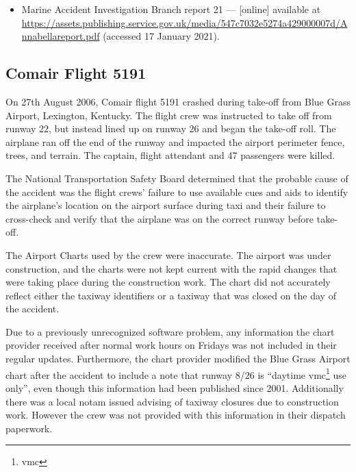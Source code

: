 \begin{itemize}
\item Marine Accident Investigation Branch report 21 ---  [online] available at \href{https://assets.publishing.service.gov.uk/media/547c7032e5274a429000007d/Annabellareport.pdf}{https://assets.publishing.service.gov.uk/media/547c7032e5274a429000007d/Annabellareport.pdf} (accessed 17 January 2021).
\end{itemize}

\subsection{Comair Flight 5191} \label{bkm:incacc:comair5191}
On 27th August 2006, Comair flight 5191 crashed during take-off from Blue Grass Airport, Lexington, Kentucky. The flight crew was instructed to take off from runway 22, but instead lined up on runway 26 and began the take-off roll. The airplane ran off the end of the runway and impacted the airport perimeter fence, trees, and terrain. The captain, flight attendant and 47 passengers were killed.

The National Transportation Safety Board determined that the probable cause of the accident was the flight crews' failure to use available cues and aids to identify the airplane's location on the airport surface during taxi and their failure to cross-check and verify that the airplane was on the correct runway before take-off.

The Airport Charts used by the crew were inaccurate. The airport was under construction, and the charts were not kept current with the rapid changes that were taking place during the construction work. The chart did not accurately reflect either the taxiway identifiers or a taxiway that was closed on the day of the accident.

Due to a previously unrecognized software problem, any information the chart provider received after normal work hours on Fridays was not included in their regular updates. Furthermore, the chart provider modified the Blue Grass Airport chart after the accident to include a note that runway 8/26 is ``daytime \acrshort{vmc}\footnote{\acrlong{vmc}} use only'', even though this information had been published since 2001. Additionally there was a local \gls{notam} issued advising of taxiway closures due to construction work. However the crew was not provided with this information in their dispatch paperwork.

